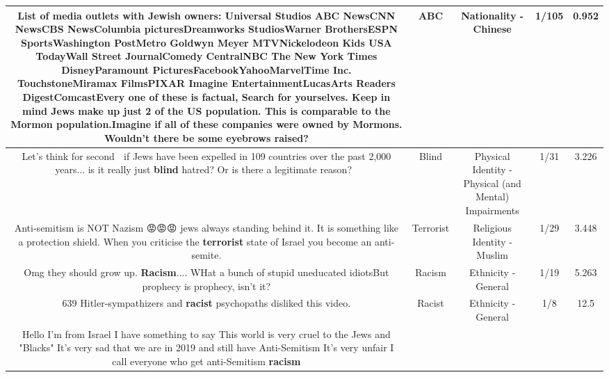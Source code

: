 \documentclass[11pt]{article}
\newlength\mylength
\begin{document}
\begin{center}
\begin{longtable}{|C{.65\mylength}|C{.30\mylength}|C{.12\mylength}|C{.12\mylength}|C{.12\mylength}|}
  \small List of media outlets with Jewish owners: Universal Studios \textbf{ABC} NewsCNN NewsCBS NewsColumbia picturesDreamworks StudiosWarner BrothersESPN SportsWashington PostMetro Goldwyn Meyer MTVNickelodeon Kids USA TodayWall Street JournalComedy CentralNBC The New York Times DisneyParamount PicturesFacebookYahooMarvelTime Inc. TouchstoneMiramax FilmsPIXAR Imagine EntertainmentLucasArts Readers DigestComcastEvery one of these is factual,  Search for yourselves.  Keep in mind Jews make up just 2 of the US population. This is comparable to the Mormon population.Imagine if all of these companies were owned by Mormons. Wouldn't there be some eyebrows raised?\normalsize   & ABC & Nationality - Chinese & 1/105 & 0.952 \\  \hline
  \small Let's think for second 🤔 if Jews have been expelled in 109 countries over the past 2,000 years... is it really just \textbf{blind} hatred? Or is there a legitimate reason? 🤔\normalsize   & Blind & Physical Identity - Physical (and Mental) Impairments & 1/31 & 3.226 \\  \hline
  \small Anti-semitism is NOT Nazism 😡😡😡 jews always standing behind it. It is something like a protection shield. When you criticise the \textbf{terrorist} state of Israel you become an anti-semite.\normalsize   & Terrorist & Religious Identity - Muslim & 1/29 & 3.448 \\  \hline
  \small Omg they should grow up. \textbf{Racism}.... WHat a bunch of stupid uneducated idiotsBut prophecy is prophecy, isn't it?\normalsize   & Racism & Ethnicity - General & 1/19 & 5.263 \\  \hline
  \small 639 Hitler-sympathizers and \textbf{racist} psychopaths disliked this video.\normalsize   & Racist & Ethnicity - General & 1/8 & 12.5 \\  \hline
  \small Hello I'm from Israel I have something to say This world is very cruel to the Jews and "Blacks" It's very sad that we are in 2019 and still have Anti-Semitism It's very unfair I call everyone who get anti-Semitism  \textbf{racism}

\end{longtable}
\end{center}
\end{document}
